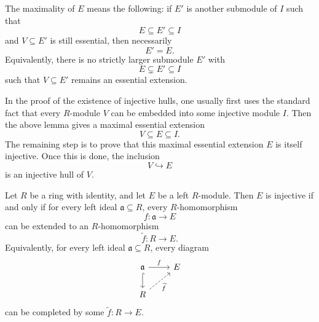             \begin{remark}
            The maximality of \(E\) means the following: if \(E'\) is another submodule of \(I\)
            such that
            \[
                E\subseteq E'\subseteq I
            \]
            and \(V\subseteq E'\) is still essential, then necessarily
            \[
                E'=E.
            \]
            Equivalently, there is no strictly larger submodule \(E'\) with
            \[
                E\subsetneq E'\subseteq I
            \]
            such that \(V\subseteq E'\) remains an essential extension.
            \end{remark}
            
            \begin{remark}
            In the proof of the existence of injective hulls, one usually first uses the standard
            fact that every \(R\)-module \(V\) can be embedded into some injective module \(I\).
            Then the above lemma gives a maximal essential extension
            \[
                V\subseteq E\subseteq I.
            \]
            The remaining step is to prove that this maximal essential extension \(E\) is itself
            injective. Once this is done, the inclusion
            \[
                V\hookrightarrow E
            \]
            is an injective hull of \(V\).
            \end{remark}

            \begin{lemma}
                Let \(R\) be a ring with identity, and let \(E\) be a left \(R\)-module. Then \(E\)
                is injective if and only if for every left ideal \(\mathfrak a\subseteq R\), every
                \(R\)-homomorphism
                \[
                    f:\mathfrak a\longrightarrow E
                \]
                can be extended to an \(R\)-homomorphism
                \[
                    \widetilde f:R\longrightarrow E.
                \]
                Equivalently, for every left ideal \(\mathfrak a\subseteq R\), every diagram
                \[
                \begin{tikzcd}
                \mathfrak a \arrow[r,"f"] \arrow[d,hook] & E \\
                R \arrow[ru,dashed,"\widetilde f"'] &
                \end{tikzcd}
                \]
                can be completed by some \(\widetilde f:R\to E\).
                \end{lemma}
                
